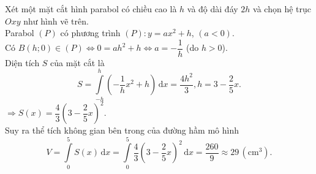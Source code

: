 \begin{ex}
{\begin{center}
\end{center}
Xét một mặt cắt hình parabol có chiều cao là $h$ và độ dài đáy $2h$ và chọn hệ trục $Oxy$ như hình vẽ trên.\\
Parabol $(P)$ có phương trình $(P)\colon y=ax^2+h$, $(a<0)$.\\
Có $B(h;0)\in(P)\Leftrightarrow 0=ah^2+h\Leftrightarrow a=-\dfrac{1}{h}$ (do $h>0$).\\
Diện tích $S$ của mặt cắt là \[S=\displaystyle\int\limits_{-h}^h\left(-\dfrac{1}{h}{x^2}+h\right)\mathrm{\,d}x=\dfrac{4h^2}{3}, h=3-\dfrac{2}{5}x.\]
$\Rightarrow S(x)=\dfrac{4}{3}{\left(3-\dfrac{2}{5}x\right)^2}.$\\
Suy ra thể tích không gian bên trong của đường hầm mô hình
\[ V=\displaystyle\int\limits_0^5S(x)\mathrm{\,d}x=\displaystyle\int\limits_0^5\dfrac{4}{3}\left(3-\dfrac{2}{5}x\right)^2\mathrm{\,d}x=\dfrac{260}{9}\approx 29\,\left(\text{cm}^3\right).\]
}
\end{ex}

